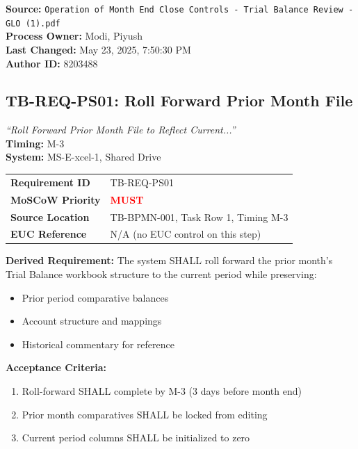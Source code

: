 \documentclass[11pt,a4paper,twoside]{report}
\begin{document}
\textbf{Source:} \texttt{Operation of Month End Close Controls - Trial Balance Review - GLO (1).pdf}\\
\textbf{Process Owner:} Modi, Piyush\\
\textbf{Last Changed:} May 23, 2025, 7:50:30 PM\\
\textbf{Author ID:} 8203488

\subsection{TB-REQ-PS01: Roll Forward Prior Month File}
\label{req:tb-req-ps01}

\begin{tcolorbox}[colback=sourcegreen!5,colframe=sourcegreen!70,title=BPMN Task Extract]
\textit{``Roll Forward Prior Month File to Reflect Current...''}\\
\textbf{Timing:} M-3\\
\textbf{System:} MS-E-xcel-1, Shared Drive
\end{tcolorbox}

\begin{tabularx}{\textwidth}{@{}lX@{}}
\toprule
\textbf{Requirement ID} & TB-REQ-PS01 \\
\textbf{MoSCoW Priority} & \textcolor{red}{\textbf{MUST}} \\
\textbf{Source Location} & TB-BPMN-001, Task Row 1, Timing M-3 \\
\textbf{EUC Reference} & N/A (no EUC control on this step) \\
\bottomrule
\end{tabularx}

\textbf{Derived Requirement:} The system SHALL roll forward the prior month's
Trial Balance workbook structure to the current period while preserving:
\begin{itemize}
\item Prior period comparative balances
\item Account structure and mappings
\item Historical commentary for reference
\end{itemize}

\textbf{Acceptance Criteria:}
\begin{enumerate}[label=AC-PS01-\arabic*:]
\item Roll-forward SHALL complete by M-3 (3 days before month end)
\item Prior month comparatives SHALL be locked from editing
\item Current period columns SHALL be initialized to zero
\end{enumerate}
\end{document}

